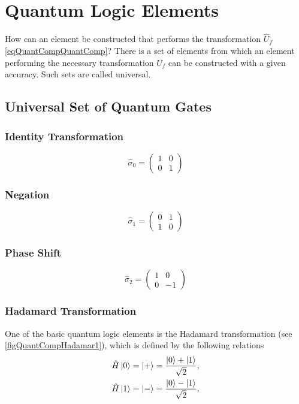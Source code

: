 \section{Quantum Logic Elements}
How can an element be constructed that performs the transformation $\hat{U}_f$ \eqref{eqQuantCompQuantComp}? There is a set of elements from which an element performing the necessary transformation $\hat{U}_f$ can be constructed with a given accuracy. Such sets are called universal.

\subsection{Universal Set of Quantum Gates}

\subsubsection{Identity Transformation}

\[
\hat{\sigma}_0 = \begin{pmatrix}
1 & 0 \\
0 & 1
\end{pmatrix}
\]

\subsubsection{Negation}

\[
\hat{\sigma}_1 = \begin{pmatrix}
0 & 1 \\
1 & 0
\end{pmatrix}
\]

\subsubsection{Phase Shift}

\[
\hat{\sigma}_2 = \begin{pmatrix}
1 & 0 \\
0 & -1
\end{pmatrix}
\]

\subsubsection{Hadamard Transformation}
One of the basic quantum logic elements is the Hadamard transformation (see \autoref{figQuantCompHadamar1}), which is defined by the following relations
\begin{eqnarray}
\hat{H} \ket{0} = \ket{+} =  
\frac{\ket{0} + \ket{1} }{\sqrt{2}},
\nonumber \\
\hat{H} \ket{1} = \ket{-} = 
\frac{\ket{0} - \ket{1} }{\sqrt{2}},
\nonumber
\end{eqnarray}

